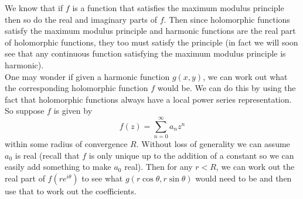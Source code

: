 We know that if $f$ is a function that satisfies the maximum modulus principle then so do the real and imaginary parts of $f$. Then since holomorphic functions satisfy the maximum modulus principle and harmonic functions are the real part of holomorphic functions, they too must satisfy the principle (in fact we will soon see that any continuous function satisfying the maximum modulus principle is harmonic).\\

One may wonder if given a harmonic function $g(x, y)$, we can work out what the corresponding holomorphic function $f$ would be. We can do this by using the fact that holomorphic functions always have a local power series representation. So suppose $f$ is given by
$$f(z) = \sum_{n = 0}^\infty a_n z^n$$
within some radius of convergence $R$. Without loss of generality we can assume $a_0$ is real (recall that $f$ is only unique up to the addition of a constant so we can easily add something to make $a_0$ real).
Then for any $r < R$, we can work out the real part of $f(re^{i\theta})$ to see what $g(r\cos \theta, r \sin \theta)$ would need to be and then use that to work out the coefficients.


